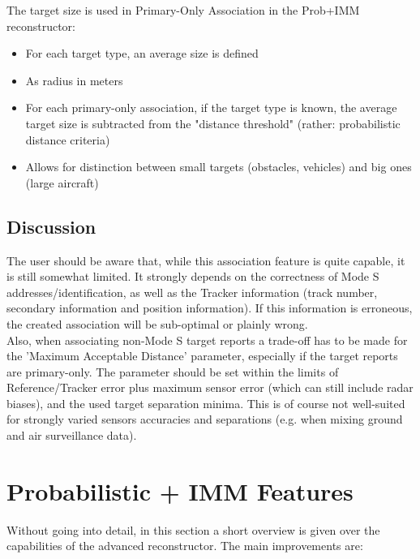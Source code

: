 \begin{itemize}
The target size is used in Primary-Only Association in the Prob+IMM reconstructor:

\begin{itemize}
\item For each target type, an average size is defined
\item As radius in meters
\item For each primary-only association, if the target type is known, the average target size is subtracted from the "distance threshold" (rather: probabilistic distance criteria)
\item Allows for distinction between small targets (obstacles, vehicles) and big ones (large aircraft)
\end{itemize}

\subsection{Discussion}

The user should be aware that, while this association feature is quite capable, it is still somewhat limited. 
It strongly depends on the correctness of Mode S addresses/identification, as well as the Tracker information (track number, secondary information and position information). 
If this information is erroneous, the created association will be sub-optimal or plainly wrong. \\

Also, when associating non-Mode S target reports a trade-off has to be made for the 'Maximum Acceptable Distance' parameter, 
especially if the target reports are primary-only. The parameter should be set within the limits of Reference/Tracker error plus maximum sensor error (which can still include radar biases), and the used target separation minima. 
This is of course not well-suited for strongly varied sensors accuracies and separations (e.g. when mixing ground and air surveillance data). \\

\section{Probabilistic + IMM Features}

Without going into detail, in this section a short overview is given over the capabilities of the advanced reconstructor. The main improvements are:


\end{itemize}
